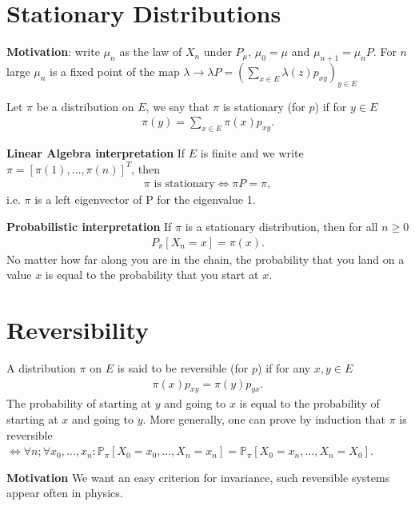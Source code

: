 \section{Stationary Distributions}
\textbf{Motivation}: write $\mu_{n}$ as the law of $X_{n}$ under $P_{\mu}$, $\mu_0=\mu$ and $\mu_{n+1}=\mu_{n}P$. For $n$ large $\mu_n$ is a fixed point of the map $\lambda \to \lambda P = \left( \sum_{x \in E} \lambda(z)p_{xy} \right)_{y \in E}$

\begin{defn}
	Let $\pi$ be a distribution on $E$, we say that $\pi$ is stationary (for $p$) if for $y \in E$
\begin{align}
	\boxed{ \pi(y) = \sum_{x \in E} \pi(x)p_{xy}}
.\end{align}

\textbf{Linear Algebra interpretation} If $E$ is finite and we write  $\pi = [\pi(1), \ldots ,\pi(n)]^T$, then 
\begin{align}
	\boxed{ \pi \textrm{ is stationary} \iff \pi P = \pi },
\end{align}
i.e. $\pi$ is a left eigenvector of P for the eigenvalue 1.

\textbf{Probabilistic interpretation} If $\pi $ is a stationary distribution, then for all $ n \geq 0$ 
\begin{align}
	P_{\pi }[X_n =x] = \pi (x)
.\end{align}
No matter how far along you are in the chain, the probability that you land on a value $x$ is equal to the probability that you start at $x$.
\end{defn}

\section{Reversibility}
\begin{defn}
	A distribution $\pi $ on $ E$ is said to be reversible (for $p$) if for any $x,y \in E$
\begin{align}
	\boxed{ \pi (x) p_{xy}= \pi (y)p_{yx} }.
\end{align}
The probability of starting at $y$ and going to $x$ is equal to the probability of starting at $x$ and going to $y$. More generally, one can prove by induction that $\pi $ is reversible $ \iff \forall n; \forall x_0, \ldots ,x_n: \mathbb{P}_{\pi } \left[ X_0=x_0, \ldots ,X_n=x_n \right] = \mathbb{P}_{\pi } \left[ X_0=x_n, \ldots ,X_n=X_0 \right] $.
\end{defn}

\textbf{Motivation} We want an easy criterion for invariance, such reversible systems appear often in physics.

